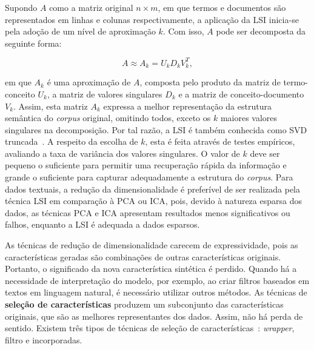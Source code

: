 \documentclass{SBCbookchapter}
\begin{document}
Supondo $A$ como a matriz original $n\times m$, em que termos e documentos são representados em linhas e colunas respectivamente, a aplicação da LSI inicia-se pela adoção de um nível de aproximação $k$. Com isso, $A$ pode ser decomposta da seguinte forma:

\begin{equation}
    A\approx A_{k} = U_{k} D_{k} V_{k}^{T},
    \label{eq:lsi}
\end{equation}

\noindent em que $A_{k}$ é uma aproximação de $A$, composta pelo produto da matriz de termo-conceito $U_{k}$, a matriz de valores singulares $D_{k}$ e a matriz de conceito-documento $V_{k}$. Assim, esta matriz $A_{k}$ expressa a melhor representação da estrutura semântica do \textit{corpus} original, omitindo todos, exceto os $k$ maiores valores singulares na decomposição. Por tal razão, a LSI é também conhecida como SVD truncada~\cite{papadimitriou2000latent,deerwester1990indexing}. A respeito da escolha de $k$, esta é feita através de testes empíricos, avaliando a taxa de variância dos valores singulares. O valor de $k$ deve ser pequeno o suficiente para permitir uma recuperação rápida da informação e grande o suficiente para capturar adequadamente a estrutura do \textit{corpus}.
Para dados textuais, a redução da dimensionalidade é preferível de ser realizada pela técnica LSI em comparação à PCA ou ICA, pois, devido à natureza esparsa dos dados, as técnicas PCA e ICA apresentam resultados menos significativos ou falhos, enquanto a LSI é adequada a dados esparsos.

As técnicas de redução de dimensionalidade carecem de expressividade, pois as características geradas são combinações de outras características originais. Portanto, o significado da nova característica sintética é perdido. Quando há a necessidade de interpretação do modelo, por exemplo, ao criar filtros baseados em textos em linguagem natural, é necessário utilizar outros métodos. As técnicas de \textbf{seleção de características} produzem um subconjunto das características originais, que são as melhores representantes dos dados. Assim, não há perda de sentido. Existem três tipos de técnicas de seleção de características~\cite{AndreoniLopez2019}: \textit{wrapper}, filtro e incorporadas.
\end{document}
